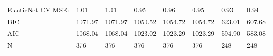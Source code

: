 \begin{table}
\begin{center}
\begin{tabular}{llllllll}
ElasticNet CV MSE:                             & 1.01    & 1.01    & 0.95     & 0.96     & 0.95     & 0.93      & 0.94     \\
BIC                                            & 1071.97 & 1071.97 & 1050.52  & 1054.72  & 1054.72  & 623.01    & 607.68   \\
AIC                                            & 1068.04 & 1068.04 & 1023.02  & 1023.29  & 1023.29  & 594.90    & 583.08   \\
N                                              & 376     & 376     & 376      & 376      & 376      & 248       & 248      \\
\hline
\end{tabular}
\end{center}
\end{table}